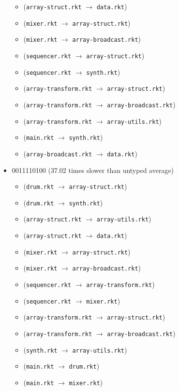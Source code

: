 \documentclass{article}
\newcommand{\mono}[1]{\texttt{#1}}
\begin{document}
\begin{itemize}
\begin{itemize}
  \item (\mono{array-struct.rkt} $\rightarrow$ \mono{data.rkt})
  \item (\mono{mixer.rkt} $\rightarrow$ \mono{array-struct.rkt})
  \item (\mono{mixer.rkt} $\rightarrow$ \mono{array-broadcast.rkt})
  \item (\mono{sequencer.rkt} $\rightarrow$ \mono{array-struct.rkt})
  \item (\mono{sequencer.rkt} $\rightarrow$ \mono{synth.rkt})
  \item (\mono{array-transform.rkt} $\rightarrow$ \mono{array-struct.rkt})
  \item (\mono{array-transform.rkt} $\rightarrow$ \mono{array-broadcast.rkt})
  \item (\mono{array-transform.rkt} $\rightarrow$ \mono{array-utils.rkt})
  \item (\mono{main.rkt} $\rightarrow$ \mono{synth.rkt})
  \item (\mono{array-broadcast.rkt} $\rightarrow$ \mono{data.rkt})
  \end{itemize}
\item 0011110100 (37.02 times slower than untyped average)
  \begin{itemize}
  \item (\mono{drum.rkt} $\rightarrow$ \mono{array-struct.rkt})
  \item (\mono{drum.rkt} $\rightarrow$ \mono{synth.rkt})
  \item (\mono{array-struct.rkt} $\rightarrow$ \mono{array-utils.rkt})
  \item (\mono{array-struct.rkt} $\rightarrow$ \mono{data.rkt})
  \item (\mono{mixer.rkt} $\rightarrow$ \mono{array-struct.rkt})
  \item (\mono{mixer.rkt} $\rightarrow$ \mono{array-broadcast.rkt})
  \item (\mono{sequencer.rkt} $\rightarrow$ \mono{array-transform.rkt})
  \item (\mono{sequencer.rkt} $\rightarrow$ \mono{mixer.rkt})
  \item (\mono{array-transform.rkt} $\rightarrow$ \mono{array-struct.rkt})
  \item (\mono{array-transform.rkt} $\rightarrow$ \mono{array-broadcast.rkt})
  \item (\mono{synth.rkt} $\rightarrow$ \mono{array-utils.rkt})
  \item (\mono{main.rkt} $\rightarrow$ \mono{drum.rkt})
  \item (\mono{main.rkt} $\rightarrow$ \mono{mixer.rkt})

\end{itemize}
\end{itemize}
\end{document}
